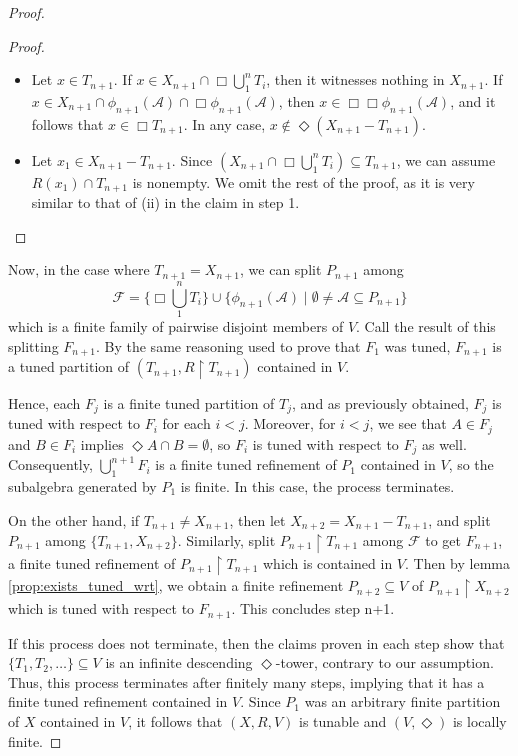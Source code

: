 \documentclass[submission]{eptcs}
\begin{document}
\begin{proof}
    \begin{proof}
    \begin{itemize}
    \item[(i)] Let $x \in T_{n+1}$.
        If $x\in X_{n+1}\cap\Box\bigcup_1^n T_i$, then it witnesses nothing in $X_{n+1}$.
        If $x\in X_{n+1} \cap \phi_{n+1}(\mathcal{A}) \cap \Box\phi_{n+1}(\mathcal{A})$, then $x \in \Box\Box\phi_{n+1}(\mathcal{A})$, and it follows that $x \in \Box T_{n+1}$. In any case, $x \notin \Diamond(X_{n+1} - T_{n+1})$.
    \item[(ii)] Let $x_1 \in X_{n+1}-T_{n+1}$. 
    Since $(X_{n+1}\cap\Box\bigcup_1^nT_i) \subseteq T_{n+1}$, we can assume $R(x_1) \cap T_{n+1}$ is nonempty. 
    We omit the rest of the proof, as it is very similar to that of (ii) in the claim in step 1.
    \end{itemize}
    \end{proof}
    \par
    Now, in the case where $T_{n+1}=X_{n+1}$, we can split $P_{n+1}$ among 
    \[
    \mathcal{F}=\{\Box\bigcup_1^nT_i\}\cup \{\phi_{n+1}(\mathcal{A}) \mid \emptyset \neq \mathcal{A} \subseteq P_{n+1}\}
    \]
    which is a finite family of pairwise disjoint members of $V$. Call the result of this splitting $F_{n+1}$. 
    By the same reasoning used to prove that $F_1$ was tuned, $F_{n+1}$ is a tuned partition of $(T_{n+1},R\restriction T_{n+1})$ contained in $V$.
    \par
    Hence, each $F_j$ is a finite tuned partition of $T_j$, and as previously obtained, $F_j$ is tuned with respect to $F_i$ for each $i<j$.
    Moreover, for $i<j$, we see that $A \in F_j$ and $B \in F_i$ implies $\Diamond A \cap B = \emptyset$, so $F_i$ is tuned with respect to $F_j$ as well.
    Consequently, $\bigcup_1^{n+1}F_i$ is a finite tuned refinement of $P_1$ contained in $V$, so the subalgebra generated by $P_1$ is finite. In this case, the process terminates.
    \par
    On the other hand, if $T_{n+1}\neq X_{n+1}$, then let $X_{n+2}=X_{n+1}-T_{n+1}$, and split $P_{n+1}$ among $\{T_{n+1},X_{n+2}\}$.
    Similarly, split $P_{n+1} \restriction T_{n+1}$ among $\mathcal{F}$ to get $F_{n+1}$, a finite tuned refinement of $P_{n+1} \restriction T_{n+1}$ which is contained in $V$.
    Then by lemma \ref{prop:exists_tuned_wrt}, we obtain a finite refinement $P_{n+2}\subseteq V$ of $P_{n+1}\restriction X_{n+2}$ which is tuned with respect to $F_{n+1}$. 
    This concludes step n+1.
    \par
    If this process does not terminate, then the claims proven in each step show that $\{T_1,T_2,\dots\}\subseteq V$ is an infinite descending $\Diamond$-tower, contrary to our assumption. Thus, this process terminates after finitely many steps, implying that it has a finite tuned refinement contained in $V$.
    Since $P_1$ was an arbitrary finite partition of $X$ contained in $V$, it follows that $(X,R,V)$ is tunable and $(V,\Diamond)$ is locally finite.    
\end{proof}
\end{document}
